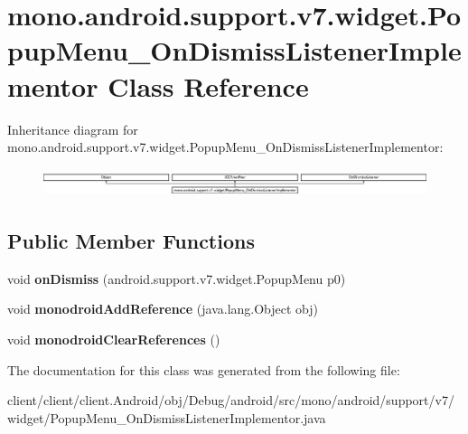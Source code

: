 \hypertarget{classmono_1_1android_1_1support_1_1v7_1_1widget_1_1PopupMenu__OnDismissListenerImplementor}{}\section{mono.\+android.\+support.\+v7.\+widget.\+Popup\+Menu\+\_\+\+On\+Dismiss\+Listener\+Implementor Class Reference}
\label{classmono_1_1android_1_1support_1_1v7_1_1widget_1_1PopupMenu__OnDismissListenerImplementor}
Inheritance diagram for mono.\+android.\+support.\+v7.\+widget.\+Popup\+Menu\+\_\+\+On\+Dismiss\+Listener\+Implementor\+:\begin{figure}[H]
\begin{center}
\leavevmode
\includegraphics[height=0.827790cm]{classmono_1_1android_1_1support_1_1v7_1_1widget_1_1PopupMenu__OnDismissListenerImplementor}
\end{center}
\end{figure}
\subsection*{Public Member Functions}
\begin{DoxyCompactItemize}
\item 
\hypertarget{classmono_1_1android_1_1support_1_1v7_1_1widget_1_1PopupMenu__OnDismissListenerImplementor_a474799f83aa29d01bffdb0ba7f644163}{}void {\bfseries on\+Dismiss} (android.\+support.\+v7.\+widget.\+Popup\+Menu p0)\label{classmono_1_1android_1_1support_1_1v7_1_1widget_1_1PopupMenu__OnDismissListenerImplementor_a474799f83aa29d01bffdb0ba7f644163}

\item 
\hypertarget{classmono_1_1android_1_1support_1_1v7_1_1widget_1_1PopupMenu__OnDismissListenerImplementor_afc755fd6a7af3fa62ab68a4c2c9f4d4c}{}void {\bfseries monodroid\+Add\+Reference} (java.\+lang.\+Object obj)\label{classmono_1_1android_1_1support_1_1v7_1_1widget_1_1PopupMenu__OnDismissListenerImplementor_afc755fd6a7af3fa62ab68a4c2c9f4d4c}

\item 
\hypertarget{classmono_1_1android_1_1support_1_1v7_1_1widget_1_1PopupMenu__OnDismissListenerImplementor_ac7bbc2cdc32f800fc1ebb9767a75b29a}{}void {\bfseries monodroid\+Clear\+References} ()\label{classmono_1_1android_1_1support_1_1v7_1_1widget_1_1PopupMenu__OnDismissListenerImplementor_ac7bbc2cdc32f800fc1ebb9767a75b29a}

\end{DoxyCompactItemize}


The documentation for this class was generated from the following file\+:\begin{DoxyCompactItemize}
\item 
client/client/client.\+Android/obj/\+Debug/android/src/mono/android/support/v7/widget/Popup\+Menu\+\_\+\+On\+Dismiss\+Listener\+Implementor.\+java\end{DoxyCompactItemize}
